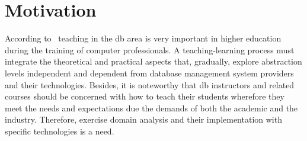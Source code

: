 \section{Motivation}

According to~ teaching in the \ac{db} area is very important in higher education during the training of computer professionals.
A teaching-learning process must integrate the theoretical and practical aspects that, gradually, explore abstraction levels independent and dependent from database management system providers and their technologies.
Besides, it is noteworthy that \ac{db} instructors and related courses should be concerned with how to teach their students 
wherefore they meet the needs and expectations due the demands of both the academic and the industry. Therefore, exercise domain analysis and their implementation with specific technologies is a need. 

